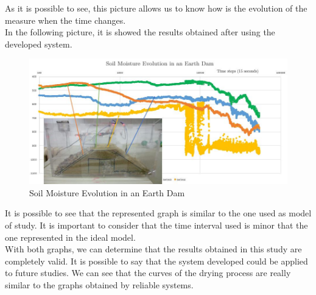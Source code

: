 As it is possible to see, this picture allows us to know how is the evolution of the measure when the time changes.\\

In the following picture, it is showed the results obtained after using the developed system.

\begin{figure}[H]
\begin{centering}
\includegraphics[scale=0.6]{IMGS/results_measures.jpeg}
\caption{Soil Moisture Evolution in an Earth Dam \label{Soil Moisture Evolution in an Earth Dam}}
\end{centering}
\end{figure} 

It is possible to see that the represented graph is similar to the one used as model of study. It is important to consider that the time interval used is minor that the one represented in the ideal model.\\

With both graphs, we can determine that the results obtained in this study are completely valid. It is possible to  say that the system developed could be applied to future studies. We can see that the curves of the drying process are really similar to the graphs obtained by reliable systems.\\

\newpage


